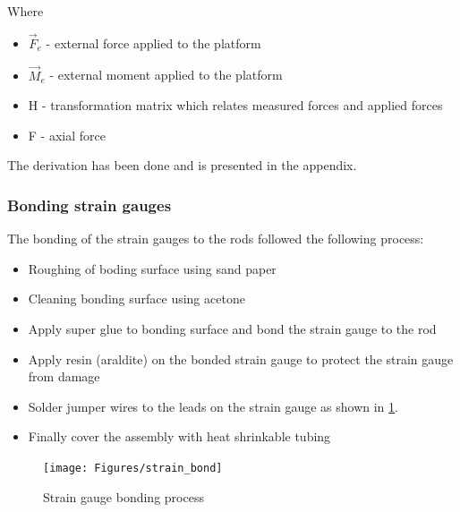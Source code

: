 Where 
\begin{itemize}
\item $\vec{F}_e $ - external force applied to the platform
\item $\vec{M}_e$ - external moment applied to the platform
\item H - transformation matrix which relates measured forces and applied forces
\item F - axial force
\end{itemize}  
The derivation has been done and is presented in the appendix.

\subsubsection*{Bonding strain gauges}
The bonding of the strain gauges to the rods followed the following process:
\begin{itemize}
	\item Roughing of boding surface using sand paper
	\item Cleaning bonding surface using acetone
	\item Apply super glue to bonding surface and bond the strain gauge to the rod
	\item Apply resin (araldite) on the bonded strain gauge to protect the strain gauge from damage
	\item Solder jumper wires to the leads on the strain gauge as shown in \ref{fig:strain_bond}.
	\item Finally cover the assembly with heat shrinkable tubing 
\end{itemize}
\begin{center}
	\begin{figure}[H]
		\centering
		\texttt{[image: Figures/strain\_bond]}
		\caption[Strain gauge bonding process]{Strain gauge bonding process}
		\label{fig:strain_bond}
	\end{figure}
\end{center}


